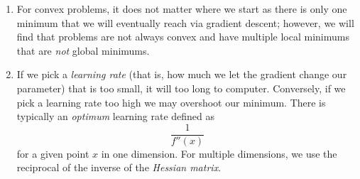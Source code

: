 \begin{remark}
    \hfill
    \begin{enumerate}
        \item 
            For convex problems, it does not matter where we start as there is
            only one minimum that we will eventually reach via gradient descent;
            however, we will find that problems are not always convex and have
            multiple local minimums that are \emph{not} global minimums.

        \item 
            If we pick a \emph{learning rate} (that is, how much we let the
            gradient change our parameter) that is too small, it will too long
            to computer.
            Conversely, if we pick a learning rate too high we may overshoot our
            minimum.
            There is typically an \emph{optimum} learning rate defined as
            \[ \frac1{f''(x)} \]
            for a given point $x$ in one dimension.
            For multiple dimensions, we use the reciprocal of the inverse of the
            \emph{Hessian matrix}.
    \end{enumerate}
\end{remark}
